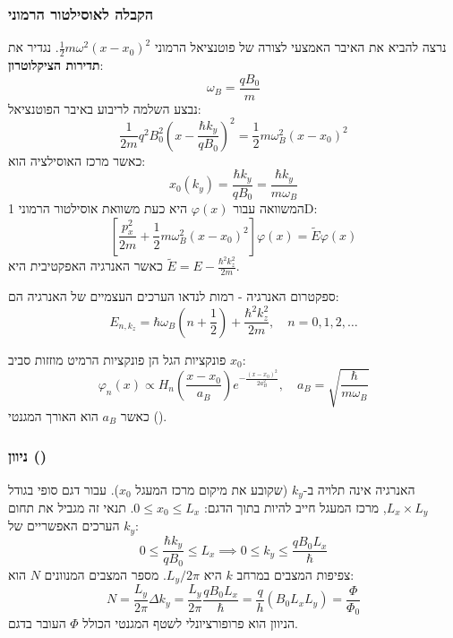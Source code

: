 \subsubsection*{הקבלה לאוסילטור הרמוני}
נרצה להביא את האיבר האמצעי לצורה של פוטנציאל הרמוני $\frac{1}{2}m\omega^2 (x-x_0)^2$.
נגדיר את \textbf{תדירות הציקלוטרון}:
\begin{equation}
\omega_B = \frac{q B_0}{m}
\end{equation}
נבצע השלמה לריבוע באיבר הפוטנציאל:
\begin{equation}
\frac{1}{2m} q^2 B_0^2 \left( x - \frac{\hbar k_y}{q B_0} \right)^2 = \frac{1}{2} m \omega_B^2 (x - x_0)^2
\end{equation}
כאשר מרכז האוסילציה הוא:
\begin{equation}
x_0(k_y) = \frac{\hbar k_y}{q B_0} = \frac{\hbar k_y}{m \omega_B}
\end{equation}
המשוואה עבור $\varphi(x)$ היא כעת משוואת אוסילטור הרמוני 1D:
\begin{equation}
\left[ \frac{p_x^2}{2m} + \frac{1}{2} m \omega_B^2 (x - x_0)^2 \right] \varphi(x) = \tilde{E} \varphi(x)
\end{equation}
כאשר האנרגיה האפקטיבית היא $\tilde{E} = E - \frac{\hbar^2 k_z^2}{2m}$.

\begin{resultbox}{ספקטרום האנרגיה - רמות לנדאו}
הערכים העצמיים של האנרגיה הם:
\begin{equation}
E_{n, k_z} = \hbar \omega_B \left( n + \frac{1}{2} \right) + \frac{\hbar^2 k_z^2}{2m}, \quad n=0,1,2,\dots
\end{equation}
\end{resultbox}

פונקציות הגל הן פונקציות הרמיט מוזזות סביב $x_0$:
\begin{equation}
\varphi_n(x) \propto H_n\left(\frac{x-x_0}{a_B}\right) e^{-\frac{(x-x_0)^2}{2a_B^2}}, \quad a_B = \sqrt{\frac{\hbar}{m\omega_B}}
\end{equation}
כאשר $a_B$ הוא האורך המגנטי ().

\subsubsection*{ניוון ()}
האנרגיה אינה תלויה ב-$k_y$ (שקובע את מיקום מרכז המעגל $x_0$).
עבור דגם סופי בגודל $L_x \times L_y$, מרכז המעגל חייב להיות בתוך הדגם: $0 \le x_0 \le L_x$.
תנאי זה מגביל את תחום הערכים האפשריים של $k_y$:
\[
0 \le \frac{\hbar k_y}{q B_0} \le L_x \implies 0 \le k_y \le \frac{q B_0 L_x}{\hbar}
\]
צפיפות המצבים במרחב $k$ היא $L_y / 2\pi$. מספר המצבים המנוונים $N$ הוא:
\[
N = \frac{L_y}{2\pi} \Delta k_y = \frac{L_y}{2\pi} \frac{q B_0 L_x}{\hbar} = \frac{q}{h} (B_0 L_x L_y) = \frac{\Phi}{\Phi_0}
\]
הניוון הוא פרופורציונלי לשטף המגנטי הכולל $\Phi$ העובר בדגם.

